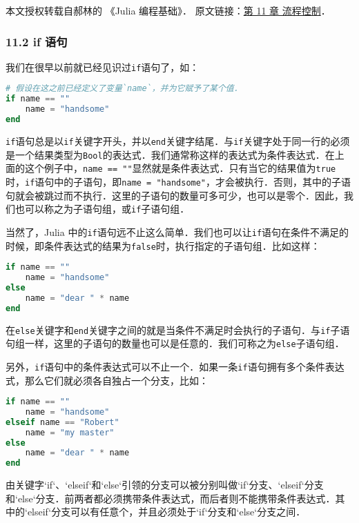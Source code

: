 
本文授权转载自郝林的 《Julia 编程基础》． 原文链接：\href{https://github.com/hyper0x/JuliaBasics/blob/master/book/ch11.md}{第 11 章 流程控制}．

\subsubsection{11.2 if 语句}

我们在很早以前就已经见识过\verb|if|语句了，如：

\begin{lstlisting}[language=julia]
# 假设在这之前已经定义了变量`name`，并为它赋予了某个值．
if name == "" 
    name = "handsome" 
end
\end{lstlisting}

\verb|if|语句总是以\verb|if|关键字开头，并以\verb|end|关键字结尾．与\verb|if|关键字处于同一行的必须是一个结果类型为\verb|Bool|的表达式．我们通常称这样的表达式为条件表达式．在上面的这个例子中，\verb|name == ""|显然就是条件表达式．只有当它的结果值为\verb|true|时，\verb|if|语句中的子语句，即\verb|name = "handsome"|，才会被执行．否则，其中的子语句就会被跳过而不执行．这里的子语句的数量可多可少，也可以是零个．因此，我们也可以称之为子语句组，或\verb|if|子语句组．

当然了，Julia 中的\verb|if|语句远不止这么简单．我们也可以让\verb|if|语句在条件不满足的时候，即条件表达式的结果为\verb|false|时，执行指定的子语句组．比如这样：

\begin{lstlisting}[language=julia]
if name == "" 
    name = "handsome" 
else 
    name = "dear " * name
end
\end{lstlisting}

在\verb|else|关键字和\verb|end|关键字之间的就是当条件不满足时会执行的子语句．与\verb|if|子语句组一样，这里的子语句的数量也可以是任意的．我们可称之为\verb|else|子语句组．

另外，\verb|if|语句中的条件表达式可以不止一个．如果一条\verb|if|语句拥有多个条件表达式，那么它们就必须各自独占一个分支，比如：

\begin{lstlisting}[language=julia]
if name == ""
    name = "handsome"
elseif name == "Robert"
    name = "my master"
else
    name = "dear " * name
end
\end{lstlisting}

由关键字`if`、`elseif`和`else`引领的分支可以被分别叫做`if`分支、`elseif`分支和`else`分支．前两者都必须携带条件表达式，而后者则不能携带条件表达式．其中的`elseif`分支可以有任意个，并且必须处于`if`分支和`else`分支之间．

